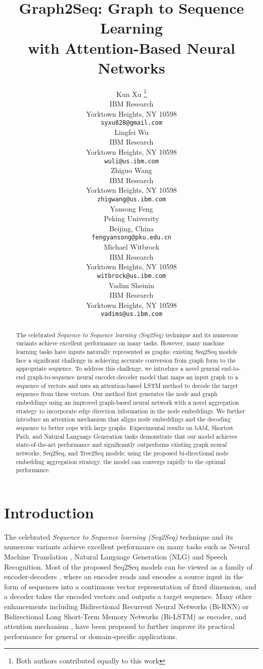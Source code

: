 \documentclass{article} \usepackage{iclr2019_conference,times}
\title{Graph2Seq: Graph to Sequence Learning \\ with Attention-Based Neural Networks}
\author{
  Kun Xu \thanks{Both authors contributed equally to this work}\\
  IBM Research\\
  Yorktown Heights, NY 10598\\
  \texttt{syxu828@gmail.com} \\
  \And
  Lingfei Wu {\small{}}\\
  IBM Research\\
  Yorktown Heights, NY 10598\\
  \texttt{wuli@us.ibm.com} \\
  \AND
  Zhiguo Wang \\
  IBM Research\\
  Yorktown Heights, NY 10598\\
  \texttt{zhigwang@us.ibm.com} \\
  \And
  Yansong Feng  \\
  Peking University\\
  Beijing, China \\
  \texttt{fengyansong@pku.edu.cn} \\
  \AND
  Michael Witbrock\\
  IBM Research\\
  Yorktown Heights, NY 10598\\
  \texttt{witbrock@us.ibm.com} \\
  \And
  Vadim Sheinin \\
  IBM Research\\
  Yorktown Heights, NY 10598\\
  \texttt{vadims@us.ibm.com} \\
}
\begin{document}
\maketitle

\begin{abstract}
The celebrated \emph{Sequence to Sequence learning (Seq2Seq)} technique and its numerous variants achieve excellent performance on many tasks. However, many machine learning tasks have inputs naturally represented as graphs; existing Seq2Seq models face a significant challenge in achieving accurate conversion from graph form to the appropriate sequence. To address this challenge, we introduce a novel general end-to-end graph-to-sequence neural encoder-decoder model that maps an input graph to a sequence of vectors and uses an attention-based LSTM method to decode the target sequence from these vectors. Our method first generates the node and graph embeddings using an improved graph-based neural network with a novel aggregation strategy to incorporate edge direction information in the node embeddings. We further introduce an attention mechanism that aligns node embeddings and the decoding sequence to better cope with large graphs. Experimental results on bAbI, Shortest Path, and Natural Language Generation tasks demonstrate that our model achieves state-of-the-art performance and significantly outperforms existing graph neural networks, Seq2Seq, and Tree2Seq models; using the proposed bi-directional node embedding aggregation strategy, the model can converge rapidly to the optimal performance.
\end{abstract}


\section{Introduction}
The celebrated \emph{Sequence to Sequence learning (Seq2Seq)} technique and its numerous variants achieve excellent performance on many tasks such as Neural Machine Translation \citep{bahdanau2014neural, gehring2017convolutional}, Natural Language Generation (NLG) \citep{DBLP:conf/acl/SongPZWG17} and Speech Recognition\citep{zhang2017very}.
Most of the proposed Seq2Seq models can be viewed as a family of encoder-decoders \citep{DBLP:conf/nips/SutskeverVL14, cho2014learning, bahdanau2014neural}, where an encoder reads and encodes a source input in the form of sequences into a continuous vector representation of fixed dimension, and a decoder takes the encoded vectors and outputs a target sequence. Many other enhancements including Bidirectional Recurrent Neural Networks (Bi-RNN) \citep{schuster1997bidirectional} or Bidirectional Long Short-Term Memory Networks (Bi-LSTM) \citep{graves2005framewise} as encoder, and attention mechanism \citep{bahdanau2014neural,luong2015effective}, have been proposed to further improve its practical performance for general or domain-specific applications.   
\end{document}
